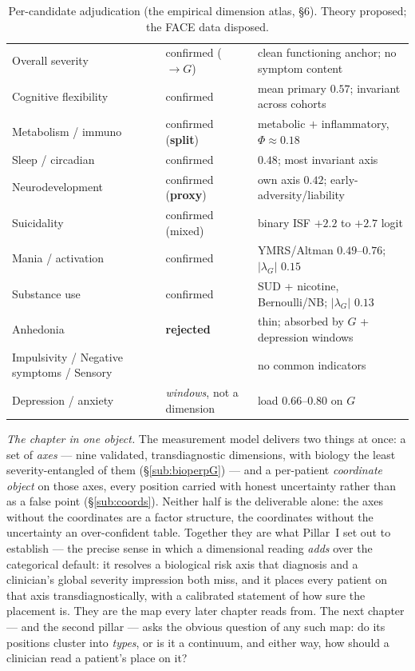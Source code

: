 \begin{table}[h]\centering\small\sffamily
\caption{Per-candidate adjudication (the empirical dimension atlas, §6). Theory proposed; the FACE data
disposed.}
\label{tab:adjudication}
\begin{tabular}{L{4.6cm} L{3.4cm} L{6.0cm}}
\toprule
{} &  & \\
\midrule
{} Overall severity & confirmed ($\to G$) & clean functioning anchor; no symptom content\\
Cognitive flexibility & confirmed & mean primary $0.57$; invariant across cohorts\\
 Metabolism / immuno & confirmed (\textbf{split}) & metabolic $+$ inflammatory, $\Phi\approx 0.18$\\
Sleep / circadian & confirmed & $0.48$; most invariant axis\\
 Neurodevelopment & confirmed (\textbf{proxy}) & own axis $0.42$; early-adversity/liability\\
Suicidality & confirmed (mixed) & binary ISF $+2.2$ to $+2.7$ logit\\
 Mania / activation & confirmed & YMRS/Altman $0.49$--$0.76$; $|\lambda_G|$ $0.15$\\
Substance use & confirmed & SUD + nicotine, Bernoulli/NB; $|\lambda_G|$ $0.13$\\
 Anhedonia & \textbf{rejected} & thin; absorbed by $G$ + depression windows\\
Impulsivity / Negative symptoms / Sensory &  & no common indicators\\
 Depression / anxiety & \emph{windows}, not a dimension & load $0.66$--$0.80$ on $G$\\
\bottomrule
\end{tabular}
\end{table}

\medskip\noindent\emph{The chapter in one object.} The measurement model delivers two things at once: a set of
\emph{axes} --- nine validated, transdiagnostic dimensions, with biology the least severity-entangled of them
(\S\ref{sub:bioperpG}) --- and a per-patient \emph{coordinate object} on those axes, every position carried with
honest uncertainty rather than as a false point (\S\ref{sub:coords}). Neither half is the deliverable alone: the
axes without the coordinates are a factor structure, the coordinates without the uncertainty an over-confident
table. Together they are what Pillar~I set out to establish --- the precise sense in which a dimensional reading
\emph{adds} over the categorical default: it resolves a biological risk axis that diagnosis and a clinician's
global severity impression both miss, and it places every patient on that axis transdiagnostically, with a
calibrated statement of how sure the placement is. They are the map every later chapter reads from. The next
chapter --- and the second pillar --- asks the obvious question of any such map: do its positions cluster into
\emph{types}, or is it a continuum, and either way, how should a clinician read a patient's place on it?
